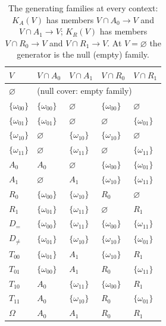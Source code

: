 \begin{table}[htbp]
\centering
\caption{The generating families at every context: $K_{A}(V)$ has members $V\cap A_{0}\to V$ and $V\cap A_{1}\to V$; $K_{R}(V)$ has members $V\cap R_{0}\to V$ and $V\cap R_{1}\to V$. At $V=\varnothing$ the generator is the null (empty) family.}
\label{ch07:tab-generating}
\begin{tabular}{@{}lllll@{}}
\toprule
$V$ & $V\cap A_{0}$ & $V\cap A_{1}$ & $V\cap R_{0}$ & $V\cap R_{1}$ \\
\midrule
$\varnothing$ & \multicolumn{4}{l}{(null cover: empty family)} \\
$\{\omega_{00}\}$ & $\{\omega_{00}\}$ & $\varnothing$ & $\{\omega_{00}\}$ & $\varnothing$ \\
$\{\omega_{01}\}$ & $\{\omega_{01}\}$ & $\varnothing$ & $\varnothing$ & $\{\omega_{01}\}$ \\
$\{\omega_{10}\}$ & $\varnothing$ & $\{\omega_{10}\}$ & $\{\omega_{10}\}$ & $\varnothing$ \\
$\{\omega_{11}\}$ & $\varnothing$ & $\{\omega_{11}\}$ & $\varnothing$ & $\{\omega_{11}\}$ \\
$A_{0}$ & $A_{0}$ & $\varnothing$ & $\{\omega_{00}\}$ & $\{\omega_{01}\}$ \\
$A_{1}$ & $\varnothing$ & $A_{1}$ & $\{\omega_{10}\}$ & $\{\omega_{11}\}$ \\
$R_{0}$ & $\{\omega_{00}\}$ & $\{\omega_{10}\}$ & $R_{0}$ & $\varnothing$ \\
$R_{1}$ & $\{\omega_{01}\}$ & $\{\omega_{11}\}$ & $\varnothing$ & $R_{1}$ \\
$D_{=}$ & $\{\omega_{00}\}$ & $\{\omega_{11}\}$ & $\{\omega_{00}\}$ & $\{\omega_{11}\}$ \\
$D_{\neq}$ & $\{\omega_{01}\}$ & $\{\omega_{10}\}$ & $\{\omega_{10}\}$ & $\{\omega_{01}\}$ \\
$T_{00}$ & $\{\omega_{01}\}$ & $A_{1}$ & $\{\omega_{10}\}$ & $R_{1}$ \\
$T_{01}$ & $\{\omega_{00}\}$ & $A_{1}$ & $R_{0}$ & $\{\omega_{11}\}$ \\
$T_{10}$ & $A_{0}$ & $\{\omega_{11}\}$ & $\{\omega_{00}\}$ & $R_{1}$ \\
$T_{11}$ & $A_{0}$ & $\{\omega_{10}\}$ & $R_{0}$ & $\{\omega_{01}\}$ \\
$\Omega$ & $A_{0}$ & $A_{1}$ & $R_{0}$ & $R_{1}$ \\
\bottomrule
\end{tabular}
\end{table}


